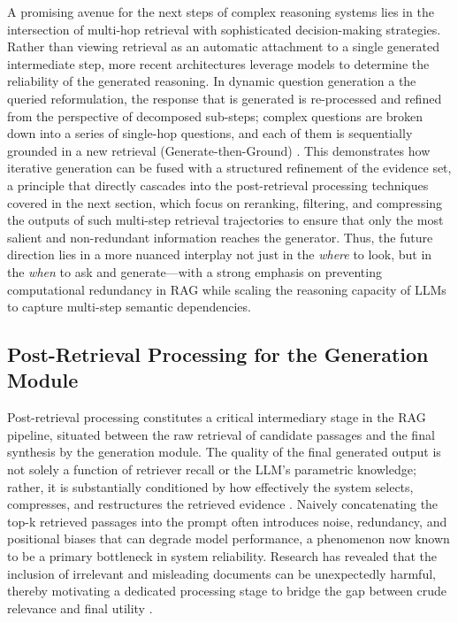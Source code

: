 \documentclass[11pt,a4paper]{article}
\begin{document}
A promising avenue for the next steps of complex reasoning systems lies in the intersection of multi-hop retrieval with sophisticated decision-making strategies. Rather than viewing retrieval as an automatic attachment to a single generated intermediate step, more recent architectures leverage models to determine the reliability of the generated reasoning. In dynamic question generation a the queried reformulation, the response that is generated is re-processed and refined from the perspective of decomposed sub-steps; complex questions are broken down into a series of single-hop questions, and each of them is sequentially grounded in a new retrieval (Generate-then-Ground) \cite{arxiv:2405.07437v2}. This demonstrates how iterative generation can be fused with a structured refinement of the evidence set, a principle that directly cascades into the post-retrieval processing techniques covered in the next section, which focus on reranking, filtering, and compressing the outputs of such multi-step retrieval trajectories to ensure that only the most salient and non-redundant information reaches the generator. Thus, the future direction lies in a more nuanced interplay not just in the \emph{where} to look, but in the \emph{when} to ask and generate---with a strong emphasis on preventing computational redundancy in RAG while scaling the reasoning capacity of LLMs to capture multi-step semantic dependencies.


\subsection{Post-Retrieval Processing for the Generation Module}


Post-retrieval processing constitutes a critical intermediary stage in the RAG pipeline, situated between the raw retrieval of candidate passages and the final synthesis by the generation module. The quality of the final generated output is not solely a function of retriever recall or the LLM's parametric knowledge; rather, it is substantially conditioned by how effectively the system selects, compresses, and restructures the retrieved evidence \cite{arxiv:2005.11401v4,arxiv:2312.10997v5}. Naively concatenating the top-k retrieved passages into the prompt often introduces noise, redundancy, and positional biases that can degrade model performance, a phenomenon now known to be a primary bottleneck in system reliability. Research has revealed that the inclusion of irrelevant and misleading documents can be unexpectedly harmful, thereby motivating a dedicated processing stage to bridge the gap between crude relevance and final utility \cite{arxiv:2401.14887v3,arxiv:2307.11019v2}.
\end{document}
